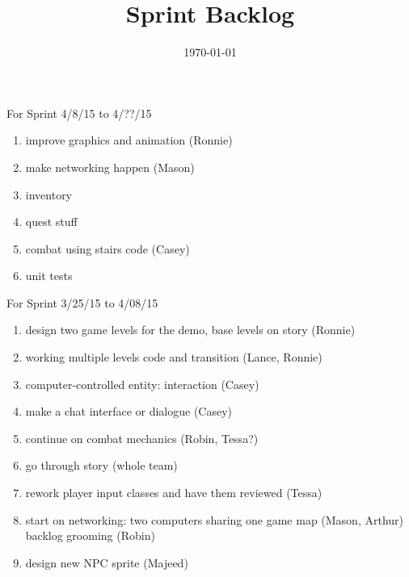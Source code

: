 \documentclass[12pt]{article}
\title{Sprint Backlog}
\date{\today}
\begin{document}
\maketitle



\begin{section}{For Sprint 4/8/15 to 4/??/15}
\begin{enumerate}


\item improve graphics and animation (Ronnie)
\item make networking happen (Mason) 
\item inventory 
\item quest stuff
\item combat using stairs code (Casey)
\item unit tests


\end{enumerate}
\end{section}



\begin{section}{For Sprint 3/25/15 to 4/08/15}
\begin{enumerate}
\item design two game levels for the demo, base levels on story (Ronnie)
\item working multiple levels code and transition (Lance, Ronnie)
\item computer-controlled entity: interaction (Casey)
\item make a chat interface or dialogue (Casey)
\item continue on combat mechanics (Robin, Tessa?)
\item go through story (whole team)
\item rework player input classes and have them reviewed (Tessa) 
\item start on networking: two computers sharing one game map (Mason, Arthur)
\itm backlog grooming (Robin)
\item design new NPC sprite (Majeed)
\end{enumerate}
\end{section}
\end{document}
